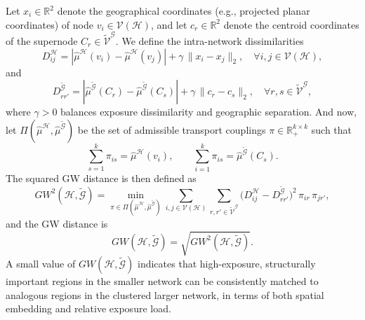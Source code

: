 \documentclass[lettersize,journal]{IEEEtran}
\begin{document}
Let $x_i \in \mathbb{R}^2$ denote the geographical coordinates (e.g., projected planar
coordinates) of node $v_i \in \mathcal{V}(\mathcal{H})$, and let $c_r \in \mathbb{R}^2$
denote the centroid coordinates of the supernode $C_r \in \tilde{\mathcal{V}}^{\mathcal{G}}$.
We define the intra-network dissimilarities
\begin{equation}
    D^{\mathcal{H}}_{ij}
    =
    \left|
        \hat{\mu}^{\mathcal{H}}(v_i)
        -
        \hat{\mu}^{\mathcal{H}}(v_j)
    \right|
    +
    \gamma \,
    \| x_i - x_j \|_2,
    \quad
    \forall i,j \in \mathcal{V}(\mathcal{H}),
\end{equation}
and
\begin{equation}
    D^{\tilde{\mathcal{G}}}_{rr'}
    =
    \left|
        \hat{\mu}^{\tilde{\mathcal{G}}}(C_r)
        -
        \hat{\mu}^{\tilde{\mathcal{G}}}(C_s)
    \right|
    +
    \gamma \,
    \| c_r - c_s \|_2,
    \quad
    \forall r,s \in \tilde{\mathcal{V}}^{\mathcal{G}},
\end{equation}
where $\gamma > 0$ balances exposure dissimilarity and geographic separation. And now, let $\Pi(\hat{\mu}^{\mathcal{H}}, \hat{\mu}^{\tilde{\mathcal{G}}})$
be the set of admissible transport couplings
$\pi \in \mathbb{R}_+^{k \times k}$ such that
\begin{equation}
    \sum_{s=1}^{k} \pi_{is} = \hat{\mu}^{\mathcal{H}}(v_i),
    \qquad
    \sum_{i=1}^{k} \pi_{is} = \hat{\mu}^{\tilde{\mathcal{G}}}(C_s).
\end{equation}
The squared GW distance is then defined as
\begin{equation}
\label{eq:gw_definition}
    GW^2(\mathcal{H}, \tilde{\mathcal{G}})
    =
    \min_{\pi \in \Pi(\hat{\mu}^{\mathcal{H}}, \hat{\mu}^{\tilde{\mathcal{G}}})}
    \sum_{i,j \in \mathcal{V}(\mathcal{H})}
    \sum_{r,r' \in \tilde{\mathcal{V}}^{\mathcal{G}}}
    \Big(
        D^{\mathcal{H}}_{ij}
        -
        D^{\tilde{\mathcal{G}}}_{rr'}
    \Big)^2
    \,
    \pi_{ir}
    \,
    \pi_{jr'},
\end{equation}
and the GW distance is
\begin{equation}
    GW(\mathcal{H}, \tilde{\mathcal{G}})
    =
    \sqrt{ GW^2(\mathcal{H}, \tilde{\mathcal{G}}) }.
\end{equation}
A small value of $GW(\mathcal{H}, \tilde{\mathcal{G}})$ indicates that high-exposure,
structurally important regions in the smaller network can be consistently matched to analogous
regions in the clustered larger network, in terms of both spatial embedding and relative exposure load.
\end{document}
